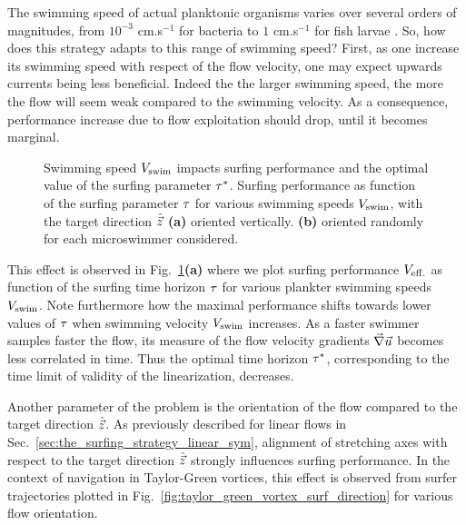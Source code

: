 The swimming speed of actual planktonic organisms varies over several orders of magnitudes, from $10^{-3}$ cm.s$^{-1}$ for bacteria to $1$ cm.s$^{-1}$ for fish larvae \citep{peters2000effects, fuchs2016seascape}.
So, how does this strategy adapts to this range of swimming speed?
First, as one increase its swimming speed with respect of the flow velocity, one may expect upwards currents being less beneficial.
Indeed the the larger swimming speed, the more the flow will seem weak compared to the swimming velocity.
As a consequence, performance increase due to flow exploitation should drop, until it becomes marginal.
\begin{figure}%
	\centering
	
	\caption[Swimming speed $\SwimmingVelocity$ impacts surfing performance and the optimal value of the surfing parameter $\TimeHorizonOpt$.]{
		Swimming speed $\SwimmingVelocity$ impacts surfing performance and the optimal value of the surfing parameter $\TimeHorizonOpt$.
		Surfing performance as function of the surfing parameter $\tau$ for various swimming speeds $\SwimmingVelocity$, with the target direction $\hat{\vec{z}}$
		\textbf{(a)} oriented vertically.
		\textbf{(b)} oriented randomly for each microswimmer considered.
	}
	\label{fig:taylor_green_vortex_tau_performance_vs_and_rdir}
\end{figure}

This effect is observed in Fig.~\ref{fig:taylor_green_vortex_tau_performance_vs_and_rdir}\textbf{(a)} where we plot surfing performance $V_{\mathrm{eff.}}$ as function of the surfing time horizon $\tau$ for various plankter swimming speeds $\SwimmingVelocity$.
Note furthermore how the maximal performance shifts towards lower values of $\tau$ when swimming velocity $\SwimmingVelocity$ increases.
As a faster swimmer samples faster the flow, its measure of the flow velocity gradients $\vec{\nabla} \vec{u}$ becomes less correlated in time.
Thus the optimal time horizon $\TimeHorizonOpt$, corresponding to the time limit of validity of the linearization, decreases.


Another parameter of the problem is the orientation of the flow compared to the target direction $\hat{\vec{z}}$.
As previously described for linear flows in Sec.~\ref{sec:the_surfing_strategy_linear_sym}, alignment of stretching axes with respect to the target direction $\hat{\vec{z}}$ strongly influences surfing performance.
In the context of navigation in Taylor-Green vortices, this effect is observed from surfer trajectories plotted in Fig.~\ref{fig:taylor_green_vortex_surf_direction} for various flow orientation.

